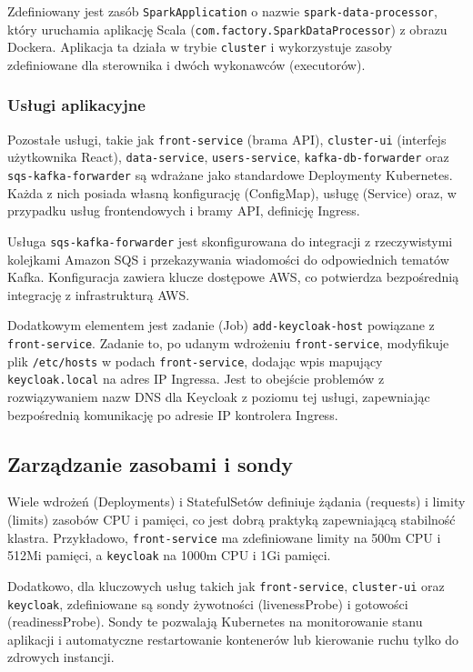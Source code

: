 Zdefiniowany jest zasób \texttt{SparkApplication} o nazwie \texttt{spark-data-processor}, który uruchamia aplikację Scala (\texttt{com.factory.SparkDataProcessor}) z obrazu Dockera. Aplikacja ta działa w trybie \texttt{cluster} i wykorzystuje zasoby zdefiniowane dla sterownika i dwóch wykonawców (executorów).

\subsubsection{Usługi aplikacyjne}
Pozostałe usługi, takie jak \texttt{front-service} (brama API), \texttt{cluster-ui} (interfejs użytkownika React), \texttt{data-service}, \texttt{users-service}, \texttt{kafka-db-forwarder} oraz \texttt{sqs-kafka-forwarder} są wdrażane jako standardowe Deploymenty Kubernetes. Każda z nich posiada własną konfigurację (ConfigMap), usługę (Service) oraz, w przypadku usług frontendowych i bramy API, definicję Ingress.

Usługa \texttt{sqs-kafka-forwarder} jest skonfigurowana do integracji z rzeczywistymi kolejkami Amazon SQS i przekazywania wiadomości do odpowiednich tematów Kafka. Konfiguracja zawiera klucze dostępowe AWS, co potwierdza bezpośrednią integrację z infrastrukturą AWS.

Dodatkowym elementem jest zadanie (Job) \texttt{add-keycloak-host} powiązane z \texttt{front-service}. Zadanie to, po udanym wdrożeniu \texttt{front-service}, modyfikuje plik \texttt{/etc/hosts} w podach \texttt{front-service}, dodając wpis mapujący \texttt{keycloak.local} na adres IP Ingressa. Jest to obejście problemów z rozwiązywaniem nazw DNS dla Keycloak z poziomu tej usługi, zapewniając bezpośrednią komunikację po adresie IP kontrolera Ingress.

\subsection{Zarządzanie zasobami i sondy}

Wiele wdrożeń (Deployments) i StatefulSetów definiuje żądania (requests) i limity (limits) zasobów CPU i pamięci, co jest dobrą praktyką zapewniającą stabilność klastra. Przykładowo, \texttt{front-service} ma zdefiniowane limity na 500m CPU i 512Mi pamięci, a \texttt{keycloak} na 1000m CPU i 1Gi pamięci.

Dodatkowo, dla kluczowych usług takich jak \texttt{front-service}, \texttt{cluster-ui} oraz \texttt{keycloak}, zdefiniowane są sondy żywotności (livenessProbe) i gotowości (readinessProbe). Sondy te pozwalają Kubernetes na monitorowanie stanu aplikacji i automatyczne restartowanie kontenerów lub kierowanie ruchu tylko do zdrowych instancji.
